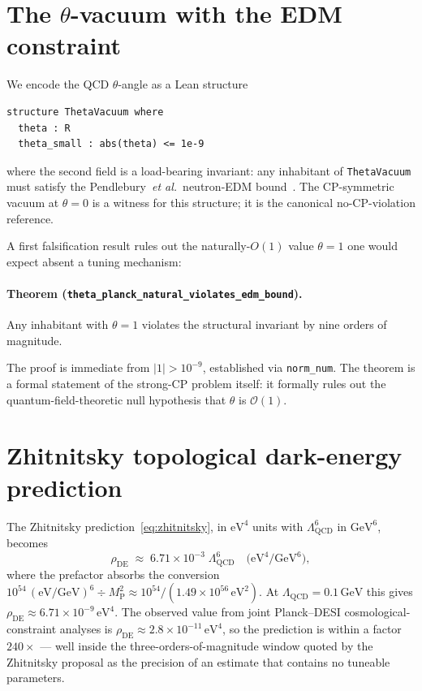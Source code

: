 \documentclass[twocolumn]{revtex4-2}
\newcommand{\rhoDE}{\rho_{\mathrm{DE}}}
\newcommand{\Lqcd}{\Lambda_{\mathrm{QCD}}}
\newcommand{\MP}{M_{\mathrm{P}}}
\begin{document}
\section{The $\theta$-vacuum with the EDM constraint}
\label{sec:theta}

We encode the QCD $\theta$-angle as a Lean structure
\begin{verbatim}
structure ThetaVacuum where
  theta : R
  theta_small : abs(theta) <= 1e-9
\end{verbatim}
where the second field is a load-bearing invariant: any inhabitant of
\verb|ThetaVacuum| must satisfy the Pendlebury~\textit{et al.\/}\
neutron-EDM bound~\cite{Pendlebury2015}. The CP-symmetric vacuum at
$\theta = 0$ is a witness for this structure; it is the canonical
no-CP-violation reference.

A first falsification result rules out the naturally-$O(1)$ value $\theta = 1$ one would expect absent a tuning mechanism:

\paragraph*{Theorem (\texttt{theta\_planck\_natural\_violates\_edm\_bound}).}
Any inhabitant with $\theta = 1$ violates the structural invariant by
nine orders of magnitude.

The proof is immediate from $|1| > 10^{-9}$, established via
\verb|norm_num|. The theorem is a formal statement of the
strong-CP problem itself: it formally rules out the
quantum-field-theoretic null hypothesis that $\theta$ is
$\mathcal{O}(1)$.

\section{Zhitnitsky topological dark-energy prediction}
\label{sec:zhitnitsky}

The Zhitnitsky prediction~\eqref{eq:zhitnitsky}, in $\mathrm{eV}^4$
units with $\Lqcd^6$ in $\mathrm{GeV}^6$, becomes
\begin{equation}
  \rhoDE \;\approx\; 6.71 \times 10^{-3}\;\Lqcd^6
  \quad
  \bigl(\mathrm{eV}^4 / \mathrm{GeV}^6\bigr),
\end{equation}
where the prefactor absorbs the conversion $10^{54}\,(\mathrm{eV}/\mathrm{GeV})^6
\div \MP^2 \approx 10^{54} / (1.49 \times 10^{56}\,\mathrm{eV}^2)$.
At $\Lqcd = 0.1\,\mathrm{GeV}$ this gives
$\rhoDE \approx 6.71 \times 10^{-9}\,\mathrm{eV}^4$. The observed value
from joint Planck--DESI cosmological-constraint analyses is
$\rhoDE \approx 2.8 \times 10^{-11}\,\mathrm{eV}^4$, so the prediction
is within a factor $240\times$ --- well inside the three-orders-of-magnitude
window quoted by the Zhitnitsky proposal as the precision of an estimate
that contains no tuneable parameters.
\end{document}
